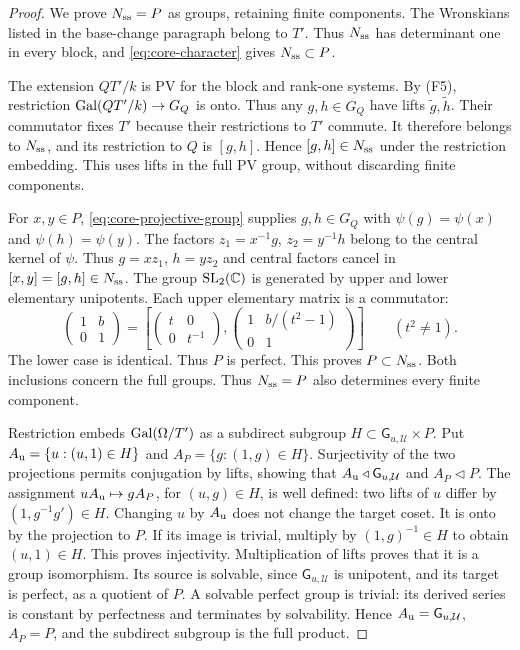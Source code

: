 \begin{proof}
We prove $N_{\rm ss}=P$ as groups, retaining finite components.
The Wronskians listed in the base-change paragraph belong to $T'$.
Thus $N_{\rm ss}$ has determinant one in every block, and
\eqref{eq:core-character}
gives $N_{\rm ss}\subset P$.

The extension $QT'/k$ is PV for the block and rank-one systems.
By (F5), restriction $\operatorname{Gal}(QT'/k)\to G_Q$ is onto.
Thus any $g,h\in G_Q$ have lifts $\widetilde g,\widetilde h$.
Their commutator fixes $T'$ because their restrictions to $T'$ commute.
It therefore belongs to $N_{\rm ss}$, and its restriction to $Q$ is
$[g,h]$. Hence $[g,h]\in N_{\rm ss}$ under the restriction embedding.
This uses lifts in the full PV group, without discarding finite components.

For $x,y\in P$, \eqref{eq:core-projective-group} supplies $g,h\in G_Q$ with
$\psi(g)=\psi(x)$ and $\psi(h)=\psi(y)$.
The factors $z_1=x^{-1}g$, $z_2=y^{-1}h$ belong to the central kernel
of $\psi$. Thus $g=xz_1$, $h=yz_2$ and central factors cancel in
$[x,y]=[g,h]\in N_{\rm ss}$.
The group $\operatorname{SL}_2(\mathbb{C})$ is generated by upper and lower elementary
unipotents. Each upper elementary matrix is a commutator:
\[
 \begin{pmatrix}1&b\\0&1\end{pmatrix}
 =\left[\begin{pmatrix}t&0\\0&t^{-1}\end{pmatrix},
         \begin{pmatrix}1&b/(t^2-1)\\0&1\end{pmatrix}\right]
 \qquad(t^2\ne1).
\]
The lower case is identical. Thus $P$ is perfect. This proves $P\subset
N_{\rm ss}$. Both inclusions concern the full groups. Thus $N_{\rm ss}=P$ also determines every finite component.

Restriction embeds $\operatorname{Gal}(\Omega/T')$ as a subdirect subgroup
$H\subset \mathsf G_{u,\mathcal U}\times P$. Put
$A_{\rm u}=\{u:(u,1)\in H\}$ and $A_P=\{g:(1,g)\in H\}$.
Surjectivity of the two projections permits conjugation by lifts,
showing that $A_{\rm u}\triangleleft \mathsf G_{u,\mathcal U}$ and $A_P\triangleleft P$.
The assignment $uA_{\rm u}\mapsto gA_P$, for $(u,g)\in H$, is well defined:
two lifts of $u$ differ by $(1,g^{-1}g')\in H$. Changing $u$ by $A_{\rm u}$
does not change the target coset. It is onto by the projection to $P$.
If its image is trivial, multiply by $(1,g)^{-1}\in H$ to obtain
$(u,1)\in H$. This proves injectivity. Multiplication of lifts proves that
it is a group isomorphism. Its source is solvable, since
$\mathsf G_{u,\mathcal U}$ is unipotent, and its target is perfect, as a quotient
of $P$. A solvable perfect group is trivial: its derived series is
constant by perfectness and terminates by solvability.
Hence $A_{\rm u}=\mathsf G_{u,\mathcal U}$,
$A_P=P$, and the subdirect subgroup is the full product.
\end{proof}

